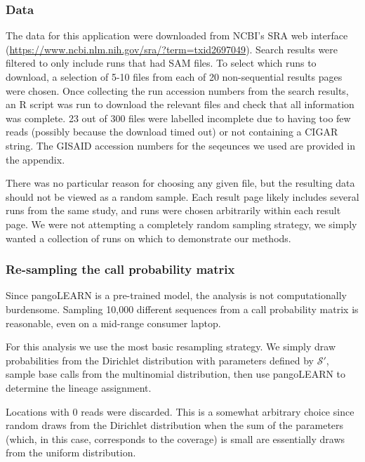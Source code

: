 \documentclass[
]{article}
\newcommand{\nps}{\mathcal{S}} %
\begin{document}
\hypertarget{data}{%
\subsubsection{Data}\label{data}}

The data for this application were downloaded from NCBI's SRA web
interface (\url{https://www.ncbi.nlm.nih.gov/sra/?term=txid2697049}).
Search results were filtered to only include runs that had SAM files. To
select which runs to download, a selection of 5-10 files from each of 20
non-sequential results pages were chosen. Once collecting the run
accession numbers from the search results, an R script was run to
download the relevant files and check that all information was complete.
23 out of 300 files were labelled incomplete due to having too few reads
(possibly because the download timed out) or not containing a CIGAR
string. The GISAID accession numbers for the seqeunces we used are
provided in the appendix.

There was no particular reason for choosing any given file, but the
resulting data should not be viewed as a random sample. Each result page
likely includes several runs from the same study, and runs were chosen
arbitrarily within each result page. We were not attempting a completely
random sampling strategy, we simply wanted a collection of runs on which
to demonstrate our methods.

\hypertarget{re-sampling-the-call-probability-matrix}{%
\subsubsection{Re-sampling the call probability
matrix}\label{re-sampling-the-call-probability-matrix}}

Since pangoLEARN is a pre-trained model, the analysis is not
computationally burdensome. Sampling 10,000 different sequences from a
call probability matrix is reasonable, even on a mid-range consumer
laptop.

For this analysis we use the most basic resampling strategy. We simply
draw probabilities from the Dirichlet distribution with parameters
defined by \(\nps'\), sample base calls from the multinomial
distribution, then use pangoLEARN to determine the lineage assignment.

Locations with 0 reads were discarded. This is a somewhat arbitrary
choice since random draws from the Dirichlet distribution when the sum
of the parameters (which, in this case, corresponds to the coverage) is
small are essentially draws from the uniform distribution.
\end{document}
